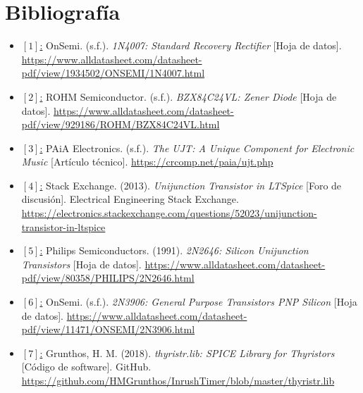 \documentclass[12pt,a4paper]{article}
\begin{document}
\section{Bibliografía}
\begin{itemize}
    \raggedright
    \item \underline{$[1]$:} OnSemi. (s.f.). \textit{1N4007: Standard Recovery Rectifier} [Hoja de datos]. \url{https://www.alldatasheet.com/datasheet-pdf/view/1934502/ONSEMI/1N4007.html}
    
    \item \underline{$[2]$:} ROHM Semiconductor. (s.f.). \textit{BZX84C24VL: Zener Diode} [Hoja de datos]. \url{https://www.alldatasheet.com/datasheet-pdf/view/929186/ROHM/BZX84C24VL.html}

    \item \underline{$[3]$:} PAiA Electronics. (s.f.). \textit{The UJT: A Unique Component for Electronic Music} [Artículo técnico]. \url{https://crcomp.net/paia/ujt.php}

    \item \underline{$[4]$:} Stack Exchange. (2013). \textit{Unijunction Transistor in LTSpice} [Foro de discusión]. Electrical Engineering Stack Exchange. \url{https://electronics.stackexchange.com/questions/52023/unijunction-transistor-in-ltspice}

    \item \underline{$[5]$:} Philips Semiconductors. (1991). \textit{2N2646: Silicon Unijunction Transistors} [Hoja de datos]. \url{https://www.alldatasheet.com/datasheet-pdf/view/80358/PHILIPS/2N2646.html}

    \item \underline{$[6]$:}  OnSemi. (s.f.). \textit{2N3906: General Purpose Transistors PNP Silicon} [Hoja de datos]. \url{https://www.alldatasheet.com/datasheet-pdf/view/11471/ONSEMI/2N3906.html}

    \item \underline{$[7]$:} Grunthos, H. M. (2018). \textit{thyristr.lib: SPICE Library for Thyristors} [Código de software]. GitHub. \url{https://github.com/HMGrunthos/InrushTimer/blob/master/thyristr.lib}
    
\end{itemize}
\end{document}
